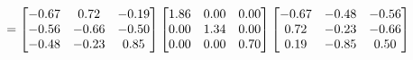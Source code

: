 \documentclass[preview]{standalone}
\begin{document}
\begin{align*}
\special{dvisvgm:raw <g id='unique000'>}= \special{dvisvgm:raw </g>}\special{dvisvgm:raw <g id='unique001'>}\begin{bmatrix} -0.67 & 0.72 & -0.19 \\ -0.56 & -0.66 & -0.50 \\ -0.48 & -0.23 & 0.85 \end{bmatrix} \special{dvisvgm:raw </g>}\special{dvisvgm:raw <g id='unique002'>}\begin{bmatrix} 1.86 & 0.00 & 0.00 \\ 0.00 & 1.34 & 0.00 \\ 0.00 & 0.00 & 0.70 \end{bmatrix} \special{dvisvgm:raw </g>}\special{dvisvgm:raw <g id='unique003'>}\begin{bmatrix} -0.67 & -0.48 & -0.56 \\ 0.72 & -0.23 & -0.66 \\ 0.19 & -0.85 & 0.50 \end{bmatrix}\special{dvisvgm:raw </g>}
\end{align*}
\end{document}
